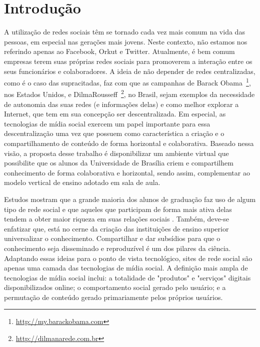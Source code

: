 \chapter{Introdução}

A utilização de redes sociais têm se tornado cada vez mais comum na vida das
pessoas, em especial nas gerações mais jovens. Neste contexto, não estamos nos
referindo apenas ao Facebook, Orkut e Twitter. \cite{germoglio2010fundamentos} 
%
Atualmente, é bem comum empresas terem suas próprias redes sociais para
promoverem a interação entre os seus funcionários e colaboradores. A ideia de
não depender de redes centralizadas, como é o caso das supracitadas, faz com que
as campanhas de Barack Obama~\footnote{\url{http://my.barackobama.com}}, nos
Estados Unidos, e DilmaRousseff~\footnote{\url{http://dilmanarede.com.br}}, no
Brasil, sejam exemplos da necessidade de autonomia das suas redes
(e informações delas) e como melhor explorar a Internet, que tem em sua
concepção ser descentralizada. 
%
Em especial, as tecnologias de mídia social exercem um papel importante para 
essa descentralização uma vez que possuem como característica a criação e o
compartilhamento de conteúdo de forma horizontal e colaborativa. 
%
Baseado nessa visão, a proposta desse trabalho é disponibilizar um ambiente
virtual que possibilite que os alunos da Universidade de Brasília criem e
compartilhem conhecimento de forma colaborativa e horizontal, sendo assim,
complementar ao modelo vertical de ensino adotado em sala de aula.

Estudos mostram que a grande maioria dos alunos de graduação faz uso de algum
tipo de rede social e que aqueles que participam de forma mais ativa delas
tendem a obter maior riqueza em suas relações sociais . 
%
Também, deve-se enfatizar que, está no cerne da criação das instituições de
ensino superior universalizar o conhecimento. Compartilhar e dar subsídios para
que o conhecimento seja disseminado e reproduzível é um dos pilares da ciência.
%
Adaptando essas ideias para o ponto de vista tecnológico, sites de rede social
são apenas uma camada das tecnologias de mídia social. A definição mais ampla de
tecnologias de mídia social inclui: a totalidade de "produtos" e "serviços"
digitais disponibilizados online; o comportamento social gerado pelo usuário; e
a permutação de conteúdo gerado primariamente pelos próprios usuários.


